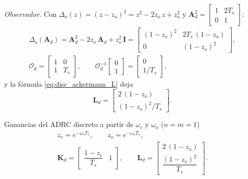 \textit{Observador.} Con $\Delta_o(z) = (z - z_o)^2 = z^2 - 2z_o\,z + z_o^2$ y
$\mathbf{A}_d^2 = \begin{bmatrix} 1 & 2T_s \\ 0 & 1 \end{bmatrix}$:
\begin{equation}
\begin{gathered}
\Delta_o(\mathbf{A}_d) = \mathbf{A}_d^2 - 2z_o\,\mathbf{A}_d + z_o^2\,\mathbf{I}
= \begin{bmatrix} (1 - z_o)^2 & 2T_s\,(1 - z_o) \\ 0 & (1 - z_o)^2 \end{bmatrix},
\\[4pt]
\mathcal{O}_d = \begin{bmatrix} 1 & 0 \\ 1 & T_s \end{bmatrix},
\qquad
\mathcal{O}_d^{-1}\begin{bmatrix} 0 \\ 1 \end{bmatrix} = \begin{bmatrix} 0 \\ 1/T_s \end{bmatrix},
\end{gathered}
\end{equation}
y la fórmula \eqref{eq:disc_ackermann_L} deja
\begin{equation}
\mathbf{L}_d = \begin{bmatrix} 2\,(1 - z_o) \\ (1 - z_o)^2/T_s \end{bmatrix} .
\label{eq:disc_ganancias}
\end{equation}

\begin{recuadro}{Ganancias del ADRC discreto a partir de $\omega_c$ y $\omega_o$ ($n = m = 1$)}
\begin{equation}
\begin{gathered}
z_c = e^{-\omega_c T_s}, \qquad z_o = e^{-\omega_o T_s}, \\[6pt]
\mathbf{K}_d = \begin{bmatrix} \dfrac{1 - z_c}{T_s} & 1 \end{bmatrix},
\qquad
\mathbf{L}_d = \begin{bmatrix} 2\,(1 - z_o) \\[4pt] \dfrac{(1 - z_o)^2}{T_s} \end{bmatrix} .
\end{gathered}
\label{eq:disc_ganancias_wc_wo}
\end{equation}
\end{recuadro}

